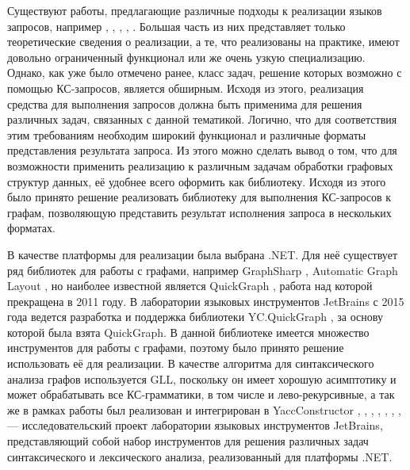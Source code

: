 \documentclass[14pt]{matmex-diploma-custom}
\begin{document}
	Существуют работы, предлагающие различные подходы к реализации языков запросов, например \cite{sevon2008subgraph}, \cite{hellings2014conjunctive}, \cite{zhang2016context}, \cite{abiteboul1997regular}, \cite{koschmieder2012regular}. Большая часть из них представляет только теоретические сведения о реализации, а те, что реализованы на практике, имеют довольно ограниченный функционал или же очень узкую специализацию. Однако, как уже было отмечено ранее, класс задач, решение которых возможно с помощью КС-запросов, является обширным. Исходя из этого, реализация средства для выполнения запросов должна быть применима для решения различных задач, связанных с данной тематикой. Логично, что для соответствия этим требованиям необходим широкий функционал и различные форматы представления результата запроса. Из этого можно сделать вывод о том, что для возможности применить реализацию к различным задачам обработки графовых структур данных, её удобнее всего оформить как библиотеку. Исходя из этого было принято решение реализовать библиотеку для выполнения КС-запросов к графам, позволяющую представить результат исполнения запроса в нескольких форматах.
	
	В качестве платформы для реализации была выбрана .NET. Для неё существует ряд библиотек для работы с графами, например GraphSharp \cite{graphsharp}, Automatic Graph Layout \cite{agl}, но наиболее известной является QuickGraph \cite{quickgraph}, работа над которой прекращена в 2011 году. В лаборатории языковых инструментов JetBrains с 2015 года ведется разработка и поддержка библиотеки YC.QuickGraph \cite{YC.QuickGraph}, за основу которой была взята QuickGraph. В данной библиотеке имеется множество инструментов для работы с графами, поэтому было принято решение использовать её для реализации. В качестве алгоритма для синтаксического анализа графов используется GLL\cite{gll}, поскольку он имеет хорошую асимптотику и может обрабатывать все КС-грамматики, в том числе и лево-рекурсивные, а так же в рамках работы \cite{ragRelaxedParsing} был реализован и интегрирован в YaccConstructor \cite{YaccConstructorPage}, \cite{авдюхин2012создание}, \cite{кириленко2013разработка}, \cite{gsv_phd}, \cite{кириленко2013разработка}, \cite{азимов2016syntax}, \cite{ковалев2016реализация}, \cite{полубелова2014генератор} --- исследовательский проект лаборатории языковых инструментов JetBrains, представляющий собой набор инструментов для решения различных задач синтаксического и лексического анализа, реализованный для платформы .NET.
	
\end{document}
